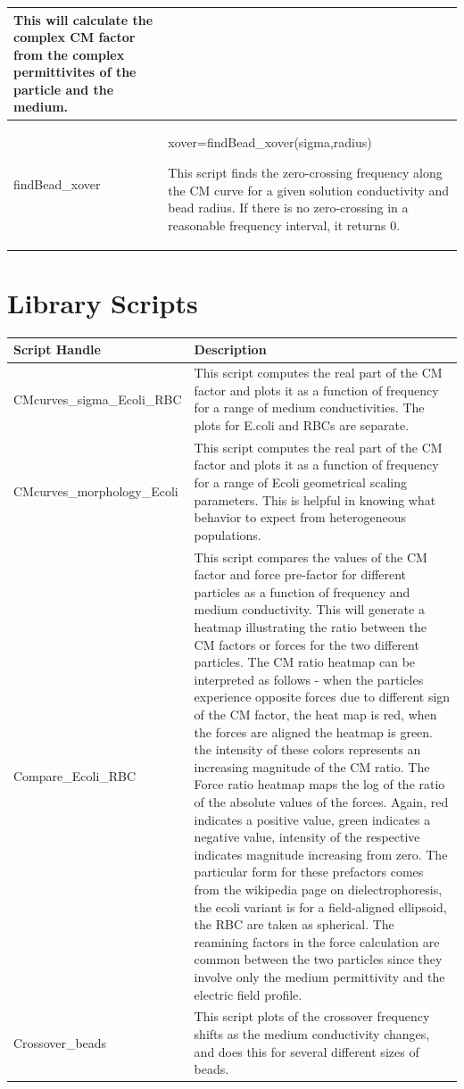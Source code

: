 \documentclass[12pt]{article}
\begin{document}
\begin{tabular}{ | l | p{13.2cm} |}
This will calculate the complex CM factor from the complex permittivites of the particle and the medium. \\
    \hline
findBead\_xover & {\footnotesize xover=findBead\_xover(sigma,radius)}
\newline

This script finds the zero-crossing frequency along the CM curve for a given solution conductivity and bead radius. If there is no zero-crossing in a reasonable frequency interval, it returns 0.
 \\
    \hline

    \end{tabular}


\section{Library Scripts}

\begin{tabular}{ | l | p{11cm} |}
    \hline
    \textbf{Script Handle} & \textbf{Description} \\ \hline
CMcurves\_sigma\_Ecoli\_RBC & This script computes the real part of the CM factor and plots it as a function of frequency for a range of medium conductivities. The plots for E.coli and RBCs are separate. \\ \hline
CMcurves\_morphology\_Ecoli & This script computes the real part of the CM factor and plots it as a function of frequency for a range of Ecoli geometrical scaling parameters. This is helpful in knowing what behavior to expect from heterogeneous populations.\\ \hline
Compare\_Ecoli\_RBC & This script compares the values of the CM factor and force pre-factor for
 different particles as a function of frequency and medium conductivity.
 This will generate a heatmap illustrating the ratio between the CM
 factors or forces for the two different particles. The CM ratio heatmap
 can be interpreted as follows - when the particles experience opposite
 forces due to different sign of the CM factor, the heat map is red, when
 the forces are aligned the heatmap is green. the intensity of these
 colors represents an increasing magnitude of the CM ratio. The Force
 ratio heatmap maps the log of the ratio of the absolute values of the forces. Again, red indicates a positive value, green indicates a negative value, intensity of the respective indicates magnitude increasing from zero. The particular form for these prefactors comes
 from the wikipedia page on dielectrophoresis, the ecoli variant is for a
 field-aligned ellipsoid, the RBC are taken as spherical. The reamining
 factors in the force calculation are common between the two particles
 since they involve only the medium permittivity and the electric field
 profile. \\ \hline
Crossover\_beads & This script plots of the crossover frequency shifts as the medium
conductivity changes, and does this for several different sizes of beads.\\
\hline
\end{tabular}
\end{document}
